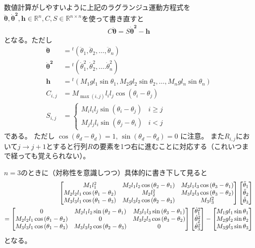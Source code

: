 \documentclass{jsarticle}
\newcommand{\eqa}[1]{\begin{align}#1\end{align}}
\newcommand{\cost}[2]{\cos\left(\theta_{#1}-\theta_{#2}\right)}
\newcommand{\sint}[2]{\sin\left(\theta_{#1}-\theta_{#2}\right)}
\newcommand{\dott}[1]{\dot{\theta}_{#1}}
\newcommand{\ddott}[1]{\ddot{\theta}_{#1}}
\begin{document}
数値計算がしやすいように上記のラグランジュ運動方程式を$\bm{\ddot{\theta}}, \bm{\dot{\theta}^2}, \bm{h} \in \mathbb{R}^n, C, S \in \mathbb{R}^{n\times n}$を使って書き直すと
\eqa{
	C \bm{\ddot{\theta}} = S \bm{\dot{\theta}^2} - \bm{h}
}
となる。ただし
\eqa{
	\bm{\ddot{\theta}} &= {}^t(\ddott{1}, \ddott{2}, \dots, \ddott{n}) \\
	\bm{\dot{\theta}^2} &= {}^t(\dott{1}^2, \dott{2}^2, \dots. \dott{n}^2) \\
	\bm{h} &= {}^t(M_1 g l_1 \sin\theta_1, M_2 g l_2 \sin\theta_2, \dots, M_n g l_n \sin\theta_n) \\
	C_{i,j} &= M_{\max(i, j)} l_i l_j \cost{i}{j} \\
	S_{i,j} &= \begin{cases}
		M_i l_i l_j \sint{i}{j} & \text{$i \ge j$}\\
		M_j l_j l_i \sint{j}{i} & \text{$i < j$}
	\end{cases}
}
である。
ただし $\cost{d}{d} = 1$, $\sint{d}{d} = 0$ に注意。
また$R_{i,j}$において$j\rightarrow j+1$とすると行列$R$の要素を1つ右に進むことに対応する（これいつまで経っても覚えられない）。

$n=3$のときに（対称性を意識しつつ）具体的に書き下して見ると
\eqa{
	\begin{bmatrix}
		M_1 l_1^2 & M_2 l_1 l_2 \cost{2}{1} & M_3 l_1 l_3 \cost{3}{1} \\
		M_2 l_2 l_1 \cost{1}{2} & M_2 l_2^2 & M_3 l_2 l_3 \cost{3}{2} \\
		M_3 l_3 l_1 \cost{1}{3} & M_3 l_3 l_2 \cost{2}{3} & M_3 l_3^2
	\end{bmatrix}
	\begin{bmatrix}
		\ddott{1} \\ \ddott{2} \\ \ddott{3}
	\end{bmatrix} \notag\\
	=
	\begin{bmatrix}
		0 & M_2 l_1 l_2 \sint{2}{1} & M_3 l_1 l_3 \sint{3}{1} \\
		M_2 l_2 l_1 \cost{1}{2} & 0 & M_3 l_2 l_3 \cost{3}{2} \\
		M_3 l_3 l_1 \cost{1}{3} & M_3 l_3 l_2 \cost{2}{3} & 0
	\end{bmatrix}
	\begin{bmatrix}
		\dott{1}^2 \\ \dott{2}^2 \\ \dott{3}^2
	\end{bmatrix}
	-
	\begin{bmatrix}
		M_1 g l_1 \sin\theta_1 \\ M_2 g l_2 \sin\theta_2 \\ M_3 g l_3 \sin\theta_3
	\end{bmatrix}
}
となる。
\end{document}
